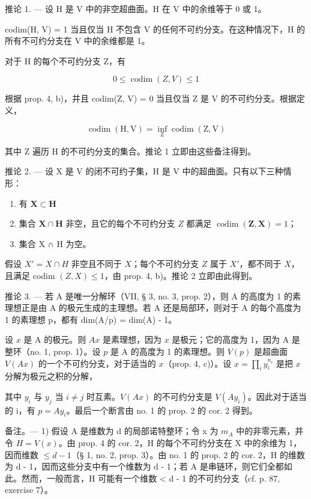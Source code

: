 推论 1. --- 设 H 是 V 中的非空超曲面。H 在 V 中的余维等于 0 或 1。

codim(H, V) = 1 当且仅当 H 不包含 V 的任何不可约分支。在这种情况下，H 的所有不可约分支在 V 中的余维都是 1。

对于 H 的每个不可约分支 Z，有

\[
0 \leqslant \operatorname{codim} (Z, V) \leqslant 1
\]

根据 prop. 4, b)，并且 codim(Z, V) = 0 当且仅当 Z 是 V 的不可约分支。根据定义，

\[
\operatorname{codim} (\mathrm{H}, \mathrm{V}) = \inf _ {\mathrm{Z}} \operatorname{codim} (\mathrm{Z}, \mathrm{V})
\]

其中 Z 遍历 H 的不可约分支的集合。推论 1 立即由这些备注得到。

推论 2. --- 设 X 是 V 的闭不可约子集，H 是 V 中的超曲面。只有以下三种情形：

\begin{enumerate}
\def\labelenumi{\arabic{enumi})}
\item
  有 \(\mathbf{X}\subset \mathbf{H}\)
\item
  集合 \(\mathbf{X} \cap \mathbf{H}\) 非空，且它的每个不可约分支 \(Z\) 都满足 \(\operatorname{codim}(\mathbf{Z}, \mathbf{X}) = 1\)；
\item
  集合 X ∩ H 为空。
\end{enumerate}

假设 \(X' = X \cap H\) 非空且不同于 \(X\)；每个不可约分支 \(Z\) 属于 \(X'\)，都不同于 \(X\)，且满足 codim \((Z, X) \leqslant 1\)，由 prop. 4, b)。推论 2 立即由此得到。

推论 3. --- 若 A 是唯一分解环（VII, § 3, no. 3, prop. 2），则 A 的高度为 1 的素理想正是由 A 的极元生成的主理想。若 A 还是局部环，则对于 A 的每个高度为 1 的素理想 p，都有 dim(A/p) = dim(A) - 1。

设 \(x\) 是 A 的极元。则 \(Ax\) 是素理想，因为 \(x\) 是极元；它的高度为 1，因为 A 是整环（no. 1, prop. 1）。设 \(p\) 是 A 的高度为 1 的素理想。则 \(V(p)\) 是超曲面 \(V(Ax)\) 的一个不可约分支，对于适当的 \(x\)（prop. 4, c)）。设 \(x = \prod_{i} y_{i}^{n_i}\) 是把 \(x\) 分解为极元之积的分解，

其中 \(y_{i}\) 与 \(y_{j}\) 当 \(i \neq j\) 时互素。\(V(Ax)\) 的不可约分支是 \(V(Ay_{i})\)。因此对于适当的 i，有 \(p = Ay_{i}\)。最后一个断言由 no. 1 的 prop. 2 的 cor. 2 得到。

备注。--- 1) 假设 A 是维数为 d 的局部诺特整环；令 x 为 \(m_{A}\) 中的非零元素，并令 \(H = V(x)\)。由 prop. 4 的 cor. 2，H 的每个不可约分支在 X 中的余维为 1，因而维数 \(\leqslant d - 1\)（§ 1, no. 2, prop. 3）。由 no. 1 的 prop. 2 的 cor. 2，H 的维数为 d - 1，因而这些分支中有一个维数为 d - 1；若 A 是串链环，则它们全都如此。然而，一般而言，H 可能有一个维数 \textless{} d - 1 的不可约分支（cf. p. 87, exercise 7）。

